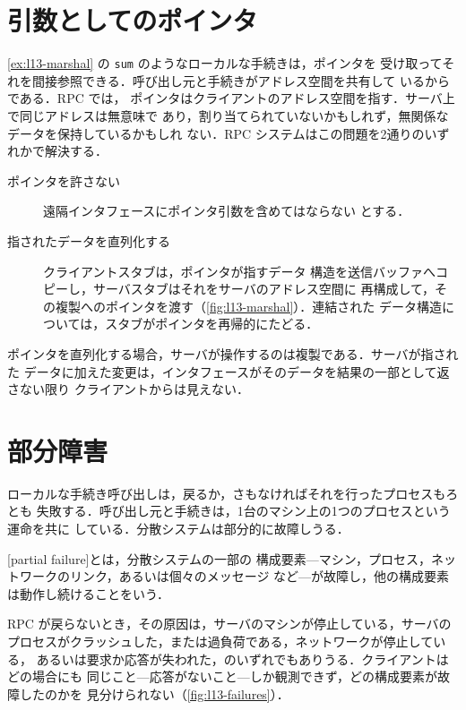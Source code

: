 \documentclass[../main.tex]{subfiles}
\begin{document}
\section{引数としてのポインタ}
\label{sec:l13-pointers}

\cref{ex:l13-marshal} の \texttt{sum} のようなローカルな手続きは，ポインタを
受け取ってそれを間接参照できる．呼び出し元と手続きがアドレス空間を共有して
いるからである．RPC では，
ポインタはクライアントのアドレス空間を指す．サーバ上で同じアドレスは無意味で
あり，割り当てられていないかもしれず，無関係なデータを保持しているかもしれ
ない．RPC システムはこの問題を2通りのいずれかで解決する．
\begin{description}
  \item[ポインタを許さない] 遠隔インタフェースにポインタ引数を含めてはならない
    とする．
  \item[指されたデータを直列化する] クライアントスタブは，ポインタが指すデータ
    構造を送信バッファへコピーし，サーバスタブはそれをサーバのアドレス空間に
    再構成して，その複製へのポインタを渡す（\cref{fig:l13-marshal}）．連結された
    データ構造については，スタブがポインタを再帰的にたどる．
\end{description}
ポインタを直列化する場合，サーバが操作するのは複製である．サーバが指された
データに加えた変更は，インタフェースがそのデータを結果の一部として返さない限り
クライアントからは見えない．

\section{部分障害}
\label{sec:l13-failures}

ローカルな手続き呼び出しは，戻るか，さもなければそれを行ったプロセスもろとも
失敗する．呼び出し元と手続きは，1台のマシン上の1つのプロセスという運命を共に
している．分散システムは部分的に故障しうる．

\begin{definition}[部分障害]
  [partial failure]とは，分散システムの一部の
  構成要素---マシン，プロセス，ネットワークのリンク，あるいは個々のメッセージ
  など---が故障し，他の構成要素は動作し続けることをいう．
\end{definition}

RPC が戻らないとき，その原因は，サーバのマシンが停止している，サーバの
プロセスがクラッシュした，または過負荷である，ネットワークが停止している，
あるいは要求か応答が失われた，のいずれでもありうる．クライアントはどの場合にも
同じこと---応答がないこと---しか観測できず，どの構成要素が故障したのかを
見分けられない（\cref{fig:l13-failures}）．
\end{document}
